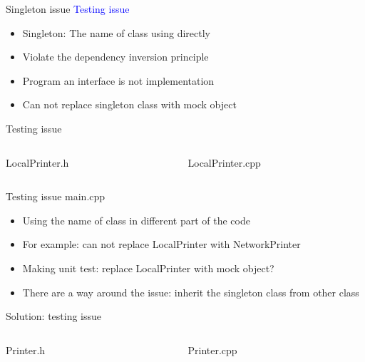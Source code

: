 \documentclass[13pt]{beamer}
\begin{document}
\begin{frame}{Singleton issue}
	\textcolor{blue}{Testing issue}
	\begin{itemize}
		\setlength\itemsep{1em}
		\item Singleton: The name of class using directly
		\item Violate the dependency inversion principle
		\item Program an interface is not implementation
		\item Can not replace singleton class with mock object
	\end{itemize}
\end{frame}

\begin{frame}{Testing issue}
\begin{columns}[T]
	\begin{column}{.45\textwidth}
		LocalPrinter.h
		\lstset{basicstyle=\tiny,style=myCustomCppStyle}
		
	\end{column}
	
	\begin{column}{.45\textwidth}
		LocalPrinter.cpp
		\lstset{basicstyle=\tiny,style=myCustomCppStyle}
		
	\end{column}
\end{columns}
\end{frame}

\begin{frame}{Testing issue}
	main.cpp
	\lstset{basicstyle=\tiny,style=myCustomCppStyle}
	
	\begin{itemize}
		\setlength\itemsep{1em}
		\item Using the name of class in different part of the code
		\item For example: can not replace LocalPrinter with NetworkPrinter
		\item Making unit test: replace LocalPrinter with mock object?
		\item There are a way around the issue: inherit the singleton class from other class
	\end{itemize}
\end{frame}

\begin{frame}{Solution: testing issue}
\begin{columns}[T]
	\begin{column}{.45\textwidth}
		Printer.h
		\lstset{basicstyle=\tiny,style=myCustomCppStyle}
		
	\end{column}
	
	\begin{column}{.45\textwidth}
		Printer.cpp
		\lstset{basicstyle=\tiny,style=myCustomCppStyle}
		
	\end{column}
\end{columns}
\end{frame}
\end{document}
